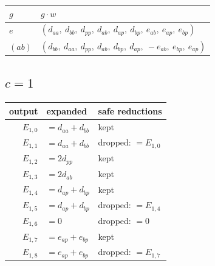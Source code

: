 \documentclass[10pt]{article}
\begin{document}
\begin{longtable}{ll}
$g$ & $g \cdot w$ \\ \hline
$e$ & $(d_{aa},\ d_{bb},\ d_{pp},\ d_{ab},\ d_{ap},\ d_{bp},\ e_{ab},\ e_{ap},\ e_{bp})$ \\
$(a b)$ & $(d_{bb},\ d_{aa},\ d_{pp},\ d_{ab},\ d_{bp},\ d_{ap},\ -e_{ab},\ e_{bp},\ e_{ap})$ \\
\end{longtable}

\subsection*{$c = 1$}
\begin{longtable}{r>{\raggedright\arraybackslash}p{}>{\raggedright\arraybackslash}p{}}
output & expanded & safe reductions \\ \hline
$E_{1,0}$ & $= d_{aa} + d_{bb}$ & kept \\
$E_{1,1}$ & $= d_{aa} + d_{bb}$ & dropped: $= E_{1,0}$ \\
$E_{1,2}$ & $= 2 d_{pp}$ & kept \\
$E_{1,3}$ & $= 2 d_{ab}$ & kept \\
$E_{1,4}$ & $= d_{ap} + d_{bp}$ & kept \\
$E_{1,5}$ & $= d_{ap} + d_{bp}$ & dropped: $= E_{1,4}$ \\
$E_{1,6}$ & $= 0$ & dropped: $= 0$ \\
$E_{1,7}$ & $= e_{ap} + e_{bp}$ & kept \\
$E_{1,8}$ & $= e_{ap} + e_{bp}$ & dropped: $= E_{1,7}$ \\
\end{longtable}
\end{document}
